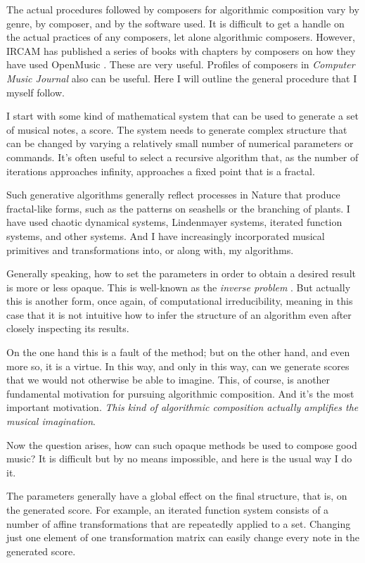 \documentclass[11pt,papersize=a4]{scrartcl}
\begin{document}
The actual procedures followed by composers for algorithmic composition vary by genre, by composer, and by the software used. It is difficult to get a handle on the actual practices of any composers, let alone algorithmic composers. However, IRCAM has published a series of books with chapters by composers on how they have used OpenMusic \parencite{omcomposersbook, agon2006om, agon2008om, agon2016om}. These are very useful. Profiles of composers in \emph{Computer Music Journal} also can be useful. Here I will outline the general procedure that I myself follow.

I start with some kind of mathematical system that can be used to generate a set of musical notes, a score. The system needs to generate complex structure that can be changed by varying a relatively small number of numerical parameters or commands. It’s often useful to select a recursive algorithm that, as the number of iterations approaches infinity, approaches a fixed point that is a fractal. 

Such generative algorithms generally reflect processes in Nature that produce fractal-like forms, such as the patterns on seashells or the branching of plants. I have used chaotic dynamical systems, Lindenmayer systems, iterated function systems, and other systems. And I have increasingly incorporated musical primitives and transformations into, or along with, my algorithms.

Generally speaking, how to set the parameters in order to obtain a desired result is more or less opaque. This is well-known as the \emph{inverse problem} \parencite{graham2021applying, tu2023learning}. But actually this is another form, once again, of computational irreducibility, meaning in this case that it is not intuitive how to infer the structure of an algorithm even after closely inspecting its results. 

On the one hand this is a fault of the method; but on the other hand, and even more so, it is a virtue. In this way, and only in this way, can we generate scores that we would not otherwise be able to imagine. This, of course, is another fundamental motivation for pursuing algorithmic composition. And it's the most important motivation. \emph{This kind of algorithmic composition actually amplifies the musical imagination}.

Now the question arises, how can such opaque methods be used to compose good music? It is difficult but by no means impossible, and here is the usual way I do it.

The parameters generally have a global effect on the final structure, that is, on the generated score. For example, an iterated function system consists of a number of affine transformations that are repeatedly applied to a set. Changing just one element of one transformation matrix can easily change every note in the generated score.
\end{document}
